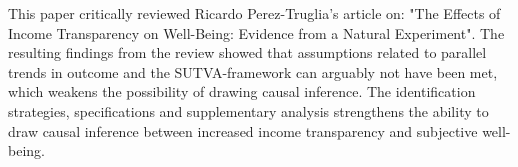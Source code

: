 This paper critically reviewed Ricardo Perez-Truglia's article on: "The Effects of Income Transparency on Well-Being: Evidence from a Natural Experiment". The resulting findings from the review showed that assumptions related to parallel trends in outcome and the SUTVA-framework can arguably not have been met, which weakens the possibility of drawing causal inference. The identification strategies, specifications and supplementary analysis strengthens the ability to draw causal inference between increased income transparency and subjective well-being.  

